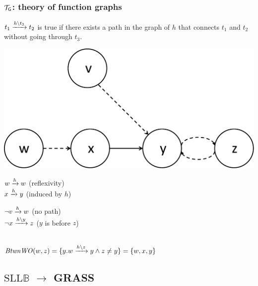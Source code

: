 \documentclass{beamer}
\begin{document}
\begin{frame}
  \frametitle{$\graphtheory$: theory of function graphs}
  
  $\creach{t_1}{t_2}{t_3}$ is true if there exists a path in the graph of $h$ that connects $t_1$ and $t_2$ without going through $t_3$.
  
  \vspace{1ex}

  \begin{center}
  \includegraphics[scale=0.4]{resources/t_reach1.pdf}
  \end{center}

  \begin{minipage}{.45\linewidth}
  $\reach{w}{w}$ (reflexivity)\\[1ex]
  $\reach{x}{y}$ (induced by $h$)
  \end{minipage}
  \begin{minipage}{.45\linewidth}
  $\neg\reach{v}{w}$ (no path)\\[1ex]
  $\neg\creach{x}{z}{y}$ ($y$ is before $z$)
  \end{minipage}\\[1ex]
  $\BtwnWO(w,z) = \{y. \creach{w}{y}{z} \land z \neq y\} = \{ w,x,y \}$

\end{frame}

\subsection{$\text{SLL}\mathbb{B}$ $\rightarrow$ GRASS}
\end{document}
